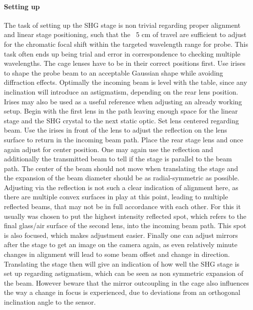 \documentclass[twoside,openright,listof=numbered]{scrreprt}
\begin{document}
\paragraph{Setting up}
The task of setting up the SHG stage is non trivial regarding proper alignment and linear stage positioning, such that the ~5 cm of travel are sufficient to adjust for the chromatic focal shift within the targeted wavelength range for probe. This task often ends up being trial and error in correspondence to checking multiple wavelengths. The cage lenses have to be in their correct positions first.\newline
Use irises to shape the probe beam to an acceptable Gaussian shape while avoiding diffraction effects. Optimally the incoming beam is level with the table, since any inclination will introduce an astigmatism, depending on the rear lens position. Irises may also be used as a useful reference when adjusting an already working setup.\newline
Begin with the first lens in the path leaving enough space for the linear stage and the SHG crystal to the next static optic. Set lens centered regarding beam. Use the irises in front of the lens to adjust the reflection on the lens surface to return in the incoming beam path.\newline
Place the rear stage lens and once again adjust for center position. One may again use the reflection and additionally the transmitted beam to tell if the stage is parallel to the beam path. The center of the beam should not move when translating the stage and the expansion of the beam diameter should be as radial-symmetric as possible. Adjusting via the reflection is not such a clear indication of alignment here, as there are multiple convex surfaces in play at this point, leading to multiple reflected beams, that may not be in full accordance with each other. For this it usually was chosen to put the highest intensity reflected spot, which refers to the final glass/air surface of the second lens, into the incoming beam path. This spot is also focused, which makes adjustment easier.\newline
Finally one can adjust mirrors after the stage to get an image on the camera again, as even relatively minute changes in alignment will lead to some beam offset and change in direction. Translating the stage then will give an indication of how well the SHG stage is set up regarding astigmatism, which can be seen as non symmetric expansion of the beam. However beware that the mirror outcoupling in the cage also influences the way a change in focus is experienced, due to deviations from an orthogonal inclination angle to the sensor.
\end{document}
